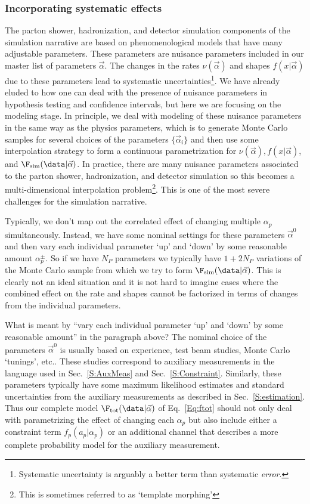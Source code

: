 \subsubsection{Incorporating systematic effects}


The parton shower, hadronization, and detector simulation components of the simulation narrative are based on phenomenological models that have many adjustable parameters.  These parameters are nuisance parameters included in our master list of parameters $\vec\alpha$.  The changes in the rates $\nu(\vec\alpha)$ and shapes $f(x|\vec\alpha)$ due to these parameters lead to systematic uncertainties\footnote{Systematic uncertainty is arguably a better term than systematic \textit{error}.}.  We have already eluded to how one can deal with the presence of nuisance parameters in hypothesis testing and confidence intervals, but here we are focusing on the modeling stage.  In principle, we deal with modeling of these nuisance parameters in the same way as the physics parameters, which is to generate Monte Carlo samples for several choices of the parameters $\{\vec\alpha_i\}$ and then use some interpolation strategy to form a continuous parametrization for $\nu(\vec\alpha), f(x|\vec\alpha)$, and $\F_{\rm sim}(\data|\vec\alpha)$.  In practice, there are many nuisance parameters associated to the parton shower, hadronization, and detector simulation so this becomes a multi-dimensional interpolation problem\footnote{This is sometimes referred to as `template morphing'}.  This is one of the most severe challenges for the simulation narrative.  


Typically, we don't map out the correlated effect of changing multiple $\alpha_p$ simultaneously.  Instead, we have some nominal settings for these parameters $\vec\alpha^0$ and then vary each individual parameter `up' and `down' by some reasonable amount $\alpha_p^\pm$.  So if we have $N_P$ parameters we typically have $1+2N_P$ variations of the Monte Carlo sample from which we try to form  $\F_{\rm sim}(\data|\vec\alpha)$.  This is clearly not an ideal situation and it is not hard to imagine cases where the combined effect on the rate and shapes cannot be factorized in terms of changes from the individual parameters.  


What is meant by ``vary each individual parameter `up' and `down' by some reasonable amount'' in the paragraph above?  The nominal choice of the parameters $\vec\alpha^0$ is usually based on experience, test beam studies,  Monte Carlo `tunings', etc..  These studies correspond to auxiliary measurements in the language used in Sec.~\ref{S:AuxMeas} and Sec.~\ref{S:Constraint}.  Similarly, these parameters typically have some maximum likelihood estimates and standard uncertainties from the auxiliary measurements as described in Sec.~\ref{S:estimation}. Thus our complete model $\F_{\rm tot}(\data|\vec\alpha)$ of Eq.~\ref{Eq:ftot} should not only deal with parametrizing the effect of changing each $\alpha_p$ but also include either a constraint term $f_p(a_p | \alpha_p)$ or an additional channel that describes a more complete probability model for the auxiliary measurement.  



